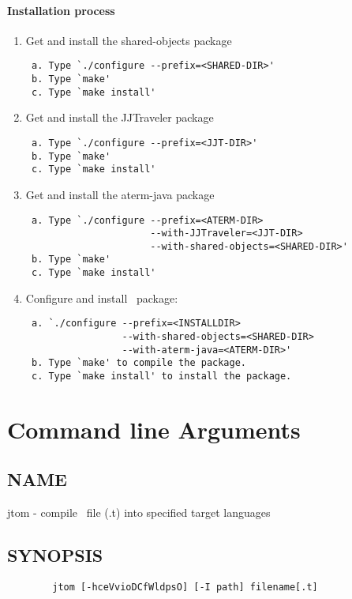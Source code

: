 \paragraph{Installation process}
\begin{enumerate}
\item Get and install the shared-objects package
\begin{verbatim}
 a. Type `./configure --prefix=<SHARED-DIR>'
 b. Type `make'
 c. Type `make install'
\end{verbatim}
\item Get and install the JJTraveler package
\begin{verbatim}
 a. Type `./configure --prefix=<JJT-DIR>'
 b. Type `make'
 c. Type `make install'
\end{verbatim}
\item Get and install the aterm-java package
\begin{verbatim}
 a. Type `./configure --prefix=<ATERM-DIR>
                      --with-JJTraveler=<JJT-DIR> 
                      --with-shared-objects=<SHARED-DIR>' 
 b. Type `make'
 c. Type `make install'
\end{verbatim}
\item Configure and install \TOM\ package:
\begin{verbatim}
 a. `./configure --prefix=<INSTALLDIR>
                 --with-shared-objects=<SHARED-DIR> 
                 --with-aterm-java=<ATERM-DIR>'
 b. Type `make' to compile the package.
 c. Type `make install' to install the package.
\end{verbatim}
\end{enumerate}


\section{Command line Arguments}
\subsection{NAME}
     jtom - compile \TOM\ file (.t) into specified target languages

\subsection{SYNOPSIS}
\verb|        jtom [-hceVvioDCfWldpsO] [-I path] filename[.t]|

